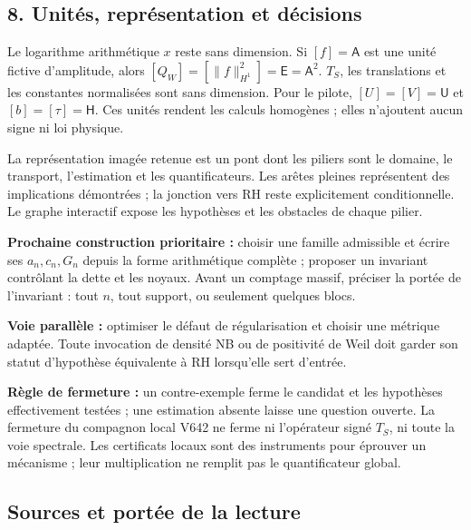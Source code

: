 \documentclass[
  10pt,
  a4paper,
]{article}
\begin{document}
\hypertarget{unituxe9s-repruxe9sentation-et-duxe9cisions}{%
\subsection{8. Unités, représentation et
décisions}\label{unituxe9s-repruxe9sentation-et-duxe9cisions}}

Le logarithme arithmétique \(x\) reste sans dimension. Si
\([f]=\mathsf A\) est une unité fictive d'amplitude, alors
\([Q_W]=[\|f\|_{H^1}^2]=\mathsf E=\mathsf A^2\). \(T_S\), les
translations et les constantes normalisées sont sans dimension. Pour le
pilote, \([U]=[V]=\mathsf U\) et \([b]=[\tau]=\mathsf H\). Ces unités
rendent les calculs homogènes ; elles n'ajoutent aucun signe ni loi
physique.

La représentation imagée retenue est un pont dont les piliers sont le
domaine, le transport, l'estimation et les quantificateurs. Les arêtes
pleines représentent des implications démontrées ; la jonction vers RH
reste explicitement conditionnelle. Le graphe interactif expose les
hypothèses et les obstacles de chaque pilier.

\textbf{Prochaine construction prioritaire :} choisir une famille
admissible et écrire ses \(a_n,c_n,G_n\) depuis la forme arithmétique
complète ; proposer un invariant contrôlant la dette et les noyaux.
Avant un comptage massif, préciser la portée de l'invariant : tout
\(n\), tout support, ou seulement quelques blocs.

\textbf{Voie parallèle :} optimiser le défaut de régularisation et
choisir une métrique adaptée. Toute invocation de densité NB ou de
positivité de Weil doit garder son statut d'hypothèse équivalente à RH
lorsqu'elle sert d'entrée.

\textbf{Règle de fermeture :} un contre-exemple ferme le candidat et les
hypothèses effectivement testées ; une estimation absente laisse une
question ouverte. La fermeture du compagnon local V642 ne ferme ni
l'opérateur signé \(T_S\), ni toute la voie spectrale. Les certificats
locaux sont des instruments pour éprouver un mécanisme ; leur
multiplication ne remplit pas le quantificateur global.

\newpage

\hypertarget{sources-et-portuxe9e-de-la-lecture}{%
\subsection{Sources et portée de la
lecture}\label{sources-et-portuxe9e-de-la-lecture}}
\end{document}
